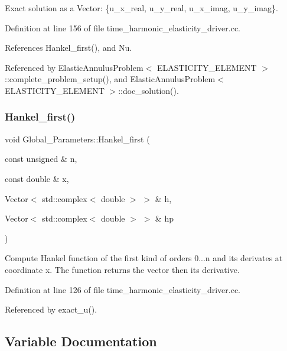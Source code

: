 Exact solution as a Vector\+: \{u\+\_\+x\+\_\+real, u\+\_\+y\+\_\+real, u\+\_\+x\+\_\+imag, u\+\_\+y\+\_\+imag\}. 



Definition at line 156 of file time\+\_\+harmonic\+\_\+elasticity\+\_\+driver.\+cc.



References Hankel\+\_\+first(), and Nu.



Referenced by Elastic\+Annulus\+Problem$<$ E\+L\+A\+S\+T\+I\+C\+I\+T\+Y\+\_\+\+E\+L\+E\+M\+E\+N\+T $>$\+::complete\+\_\+problem\+\_\+setup(), and Elastic\+Annulus\+Problem$<$ E\+L\+A\+S\+T\+I\+C\+I\+T\+Y\+\_\+\+E\+L\+E\+M\+E\+N\+T $>$\+::doc\+\_\+solution().

\mbox{\label{namespaceGlobal__Parameters_a28ae8c02f7e4ef9d552591d22f1c26f9}} 
\subsubsection{\texorpdfstring{Hankel\+\_\+first()}{Hankel\_first()}}
{\footnotesize\ttfamily void Global\+\_\+\+Parameters\+::\+Hankel\+\_\+first (\begin{DoxyParamCaption}\item[{const unsigned \&}]{n,  }\item[{const double \&}]{x,  }\item[{Vector$<$ std\+::complex$<$ double $>$ $>$ \&}]{h,  }\item[{Vector$<$ std\+::complex$<$ double $>$ $>$ \&}]{hp }\end{DoxyParamCaption})}



Compute Hankel function of the first kind of orders 0...n and its derivates at coordinate x. The function returns the vector then its derivative. 



Definition at line 126 of file time\+\_\+harmonic\+\_\+elasticity\+\_\+driver.\+cc.



Referenced by exact\+\_\+u().



\subsection{Variable Documentation}
\mbox{\label{namespaceGlobal__Parameters_a301ab922df72030c660b21328d6caf76}} 
